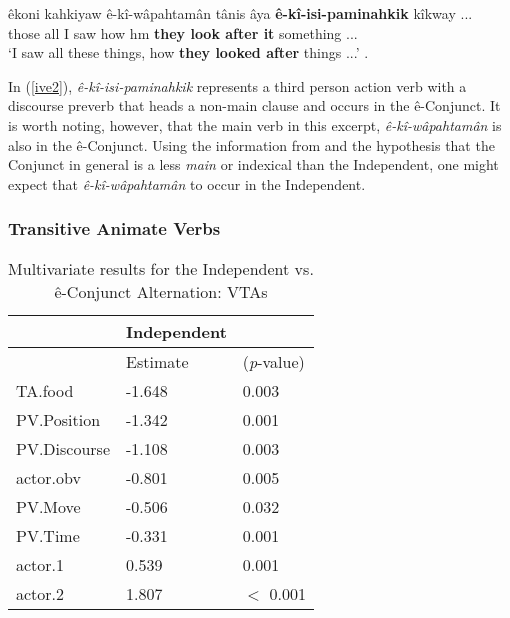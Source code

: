         \begin{exe}
        \ex
        \gll êkoni kahkiyaw ê-kî-wâpahtamân tânis âya \textbf{ê-kî-isi-paminahkik} kîkway ... \\
             those all      {I saw}         how   hm  {\textbf{they look after it}} something  ...\\
        \trans `I saw all these things, how \textbf{they looked after} things ...' \citep[96]{Minde1997kwayask}.
        \label{ive2}
        \end{exe}
        
        In (\ref{ive2}), \textit{ê-kî-isi-paminahkik} represents a third person action verb with a discourse preverb that heads a non-main clause and occurs in the ê-Conjunct. It is worth noting, however, that the main verb in this excerpt, \textit{ê-kî-wâpahtamân} is also in the ê-Conjunct. Using the information from \citet{Cook2008} and the hypothesis that the Conjunct in general is a less \textit{main} or indexical than the Independent, one might expect that \textit{ê-kî-wâpahtamân} to occur in the Independent. 

            
    \subsubsection{Transitive Animate Verbs}
            \begin{table}[H]
            \centering
            \begin{tabular}{lll}
            \toprule
                        & \textbf{Independent} \\
                    \midrule
                        & Estimate & (\textit{p}-value) & \\
            \midrule
TA.food & -1.648 & 0.003 \\
PV.Position & -1.342 & 0.001 \\
PV.Discourse & -1.108 & 0.003 \\
actor.obv & -0.801 & 0.005 \\
PV.Move & -0.506 & 0.032 \\
PV.Time & -0.331 & 0.001 \\
actor.1 & 0.539 & 0.001 \\
actor.2 & 1.807 & $<$ 0.001 \\
            \bottomrule
            \end{tabular}
            \caption{
               Multivariate results for the Independent vs. ê-Conjunct Alternation: VTAs \\ \label{tab:tiivcmv}
              }
            \end{table}

